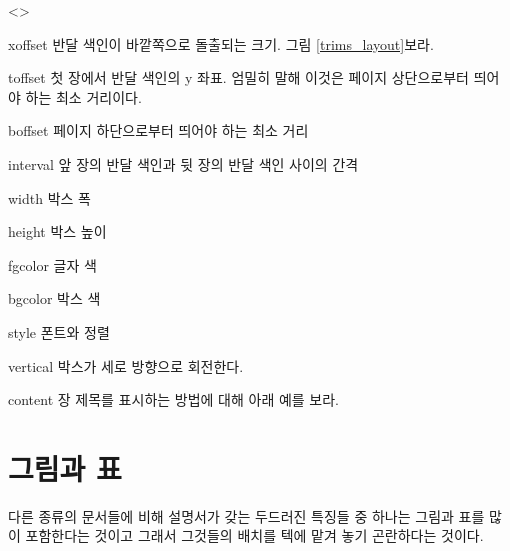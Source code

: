 \documentclass[minted]{hzguide}
\begin{document}
\begin{macros}<\ThumbIndexSetup>
\item[xoffset] \keyvalue{0mm}
반달 색인이 바깥쪽으로 돌출되는 크기. 그림 \ref{trims_layout}\을 보라.

\item[toffset] \keyvalue{30mm}
첫 장에서 반달 색인의 y 좌표. 엄밀히 말해 이것은 페이지 상단으로부터 띄어야 하는 최소 거리이다.

\item[boffset] \keyvalue{30mm}
페이지 하단으로부터 띄어야 하는 최소 거리

\item[interval] \keyvalue{5mm}
앞 장의 반달 색인과 뒷 장의 반달 색인 사이의 간격

\item[width] \keyvalue{3em}
박스 폭

\item[height] \keyvalue{2em}
박스 높이 

\item[fgcolor] 
글자 색

\item[bgcolor] 
박스 색

\item[style] \keyvalue{\bfseries\centering}
폰트와 정렬

\item[vertical] \keyvalueTF
박스가 세로 방향으로 회전한다.

\item[content] \keyvalue{\thechapter}
장 제목를 표시하는 방법에 대해 아래 예를 보라.
\end{macros}

\begin{code}
\end{code}

\ClearWatermark

\chapter{그림과 표}

\noindent 다른 종류의 문서들에 비해 설명서가 갖는 두드러진 특징들 중 하나는 그림과 표를 많이 포함한다는 것이고 그래서 그것들의 배치를 텍에 맡겨 놓기 곤란하다는 것이다.
\end{document}
